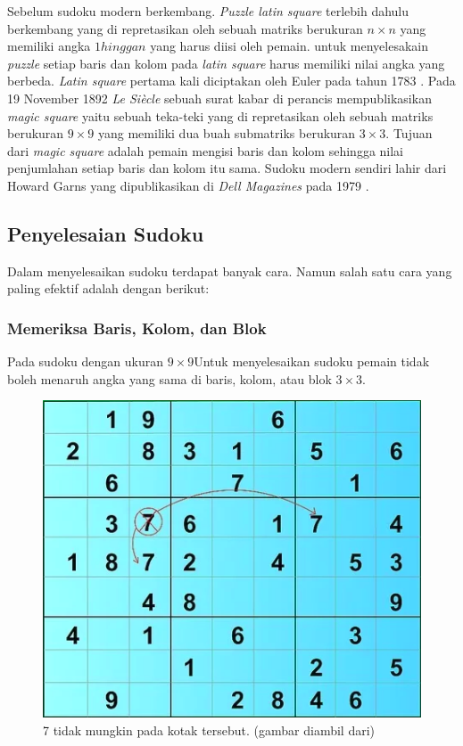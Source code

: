 Sebelum sudoku modern berkembang. \textit{Puzzle latin square} terlebih dahulu berkembang yang di repretasikan oleh sebuah matriks berukuran ${n \times n}$ yang memiliki angka ${1 hingga n}$ yang harus diisi oleh pemain. untuk menyelesakain \textit{puzzle }setiap baris dan kolom pada \textit{latin square} harus memiliki nilai angka yang berbeda. \textit{Latin square} pertama kali diciptakan oleh Euler pada tahun 1783 \cite{Unk1}. Pada 19 November 1892 \textit{ Le Siècle} sebuah surat kabar di perancis mempublikasikan \textit{magic square} yaitu sebuah teka-teki  yang di repretasikan oleh sebuah matriks berukuran ${9 \times 9}$ yang memiliki dua buah submatriks berukuran ${3 \times 3}$. Tujuan dari \textit{magic square} adalah pemain mengisi baris dan kolom sehingga nilai penjumlahan setiap baris dan kolom itu sama. Sudoku modern sendiri lahir dari  Howard Garns yang dipublikasikan di \textit{Dell Magazines} pada 1979 \cite{SATPy5}.	

\subsection{Penyelesaian Sudoku}

Dalam menyelesaikan sudoku terdapat banyak cara. Namun salah satu cara yang paling efektif adalah dengan berikut: 

\subsubsection{Memeriksa Baris, Kolom, dan Blok}

Pada sudoku dengan ukuran $9 \times 9$Untuk menyelesaikan sudoku pemain tidak boleh menaruh angka yang sama di baris, kolom, atau blok ${3 \times 3}$.

\begin{figure}[H]
	\begin{centering}
		\includegraphics[scale=0.7]{gambar/solve1}
		
		\caption{7 tidak mungkin pada kotak tersebut. (gambar diambil dari)}
	\end{centering}
\end{figure}

